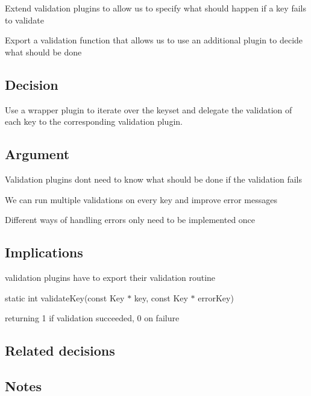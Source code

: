 \begin{DoxyItemize}
\item Extend validation plugins to allow us to specify what should happen if a key fails to validate
\item Export a validation function that allows us to use an additional plugin to decide what should be done
\end{DoxyItemize}

\subsection*{Decision}

Use a wrapper plugin to iterate over the keyset and delegate the validation of each key to the corresponding validation plugin.

\subsection*{Argument}


\begin{DoxyItemize}
\item Validation plugins don\textquotesingle{}t need to know what should be done if the validation fails
\item We can run multiple validations on every key and improve error messages
\item Different ways of handling errors only need to be implemented once
\end{DoxyItemize}

\subsection*{Implications}

validation plugins have to export their validation routine

{\ttfamily static int validate\+Key(const Key $\ast$ key, const Key $\ast$ error\+Key)}

returning 1 if validation succeeded, 0 on failure

\subsection*{Related decisions}

\subsection*{Notes}